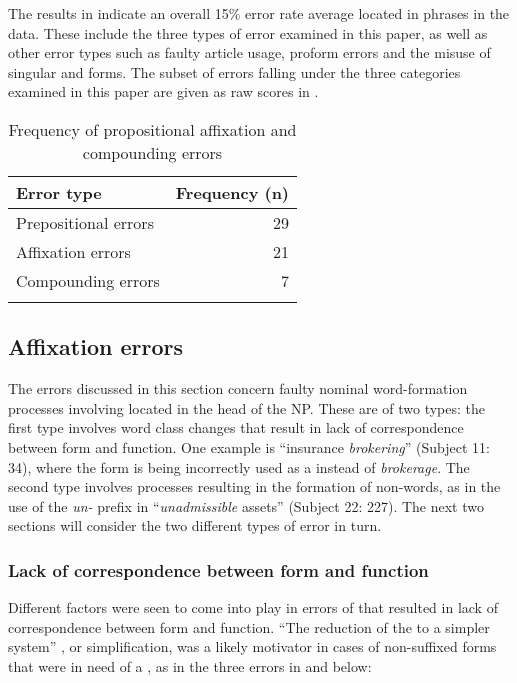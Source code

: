 \documentclass[output=paper]{langsci/langscibook}
\begin{document}
The results in  indicate an overall 15\% error rate
average located in  phrases in the data. These include the three
types of error examined in this paper, as well as other error types
such as faulty article usage, proform errors and the misuse of
singular and  forms. The subset of errors falling under the
three categories examined in this paper are given as raw scores in
.

\begin{table}
\begin{tabular}{lr}
\lsptoprule
\textbf{Error type} & \textbf{Frequency (n)}\\
\midrule 
Prepositional errors & 29\\
Affixation errors & 21\\
Compounding errors & 7\\
\lspbottomrule
\end{tabular}
\caption{Frequency of propositional affixation and compounding errors}
\label{tab:key:2}
\end{table}

\subsection{Affixation errors}
The errors discussed in this section concern faulty nominal word-formation 
processes involving  located in the head of the NP.
These are of two types: the first type involves word class
changes that result in lack of correspondence between form and
function. One example is “insurance \textit{brokering}” (Subject 11:
34), where the  form is being incorrectly used as a  instead
of \textit{brokerage}. The second type involves  processes
resulting in the formation of non-words, as in the use of the
\textit{un-} prefix in “\textit{unadmissible} assets” (Subject 22:
227). The next two sections will consider the two different types of
error in turn.


\subsubsection{Lack of correspondence between form and function}
Different factors were seen to come into play in errors of 
that resulted in lack of correspondence between form and
function. “The reduction of the  to a simpler system”
\citep[191]{Jain1974}, or simplification, was a likely motivator in
cases of non-suffixed forms that were in need of a , as in the
three errors in  and  below:
\end{document}
